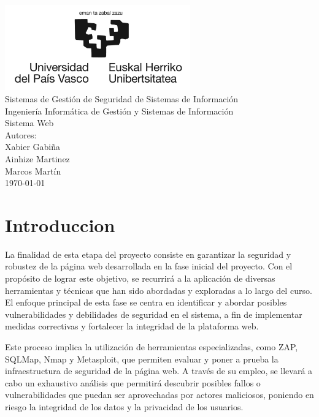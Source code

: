 \documentclass{report}
\begin{document}
    \begin{titlepage}
        \centering
        \includegraphics[width=0.6\textwidth]{./img/miscelanio/logo.jpg}\\
        \vspace{1cm}
        \LARGE Sistemas de Gestión de Seguridad de Sistemas de Información\\
        \vspace{0.5cm}
        \Large Ingeniería Informática de Gestión y Sistemas de Información\\
        \vspace{3cm}
        \Huge Sistema Web\\
        \vspace{2.5cm}
        \Large Autores:\\
        \vspace{0.2cm}
        \large Xabier Gabiña\\
        \large Ainhize Martinez\\
        \large Marcos Martín\\
        \vfill
        \today
    \end{titlepage}
    \tableofcontents
    \chapter{Introduccion}
        La finalidad de esta etapa del proyecto consiste en garantizar la seguridad y robustez de la página web desarrollada en la fase inicial del proyecto. Con el propósito de lograr este objetivo, se recurrirá a la aplicación de diversas herramientas y técnicas que han sido abordadas y exploradas a lo largo del curso. El enfoque principal de esta fase se centra en identificar y abordar posibles vulnerabilidades y debilidades de seguridad en el sistema, a fin de implementar medidas correctivas y fortalecer la integridad de la plataforma web.
        
        Este proceso implica la utilización de herramientas especializadas, como ZAP, SQLMap, Nmap y Metasploit, que permiten evaluar y poner a prueba la infraestructura de seguridad de la página web. A través de su empleo, se llevará a cabo un exhaustivo análisis que permitirá descubrir posibles fallos o vulnerabilidades que puedan ser aprovechadas por actores maliciosos, poniendo en riesgo la integridad de los datos y la privacidad de los usuarios.
        
\end{document}
